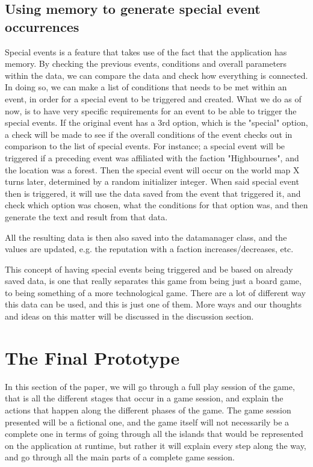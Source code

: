 \subsection{Using memory to generate special event occurrences}

Special events is a feature that takes use of the fact that the application has memory. By checking the previous events, conditions and overall parameters within the data, we can compare the data and check how everything is connected. In doing so, we can make a list of conditions that needs to be met within an event, in order for a special event to be triggered and created. What we do as of now, is to have very specific requirements for an event to be able to trigger the special events. If the original event has a 3rd option, which is the "special" option, a check will be made to see if the overall conditions of the event checks out in comparison to the list of special events.
For instance; a special event will be triggered if a preceding event was affiliated with the faction "Highbournes", and the location was a forest. Then the special event will occur on the world map X turns later, determined by a random initializer integer. When said special event then is triggered, it will use the data saved from the event that triggered it, and check which option was chosen, what the conditions for that option was, and then generate the text and result from that data.

All the resulting data is then also saved into the datamanager class, and the values are updated, e.g. the reputation with a faction increases/decreases, etc.


This concept of having special events being triggered and be based on already saved data, is one that really separates this game from being just a board game, to being something of a more technological game. There are a lot of different way this data can be used, and this is just one of them. More ways and our thoughts and ideas on this matter will be discussed in the discussion section.

\section{The Final Prototype}
In this section of the paper, we will go through a full play session of the game, that is all the different stages that occur in a game session, and explain the actions that happen along the different phases of the game.
The game session presented will be a fictional one, and the game itself will not necessarily be a complete one in terms of going through all the islands that would be represented on the application at runtime, but rather it will explain every step along the way, and go through all the main parts of a complete game session.
